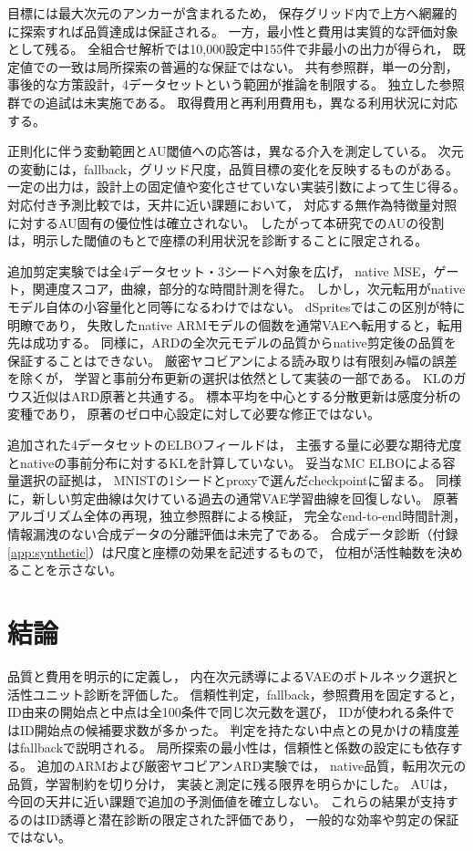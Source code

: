 \documentclass[11pt,a4paper]{ltjsarticle}
\begin{document}
目標には最大次元のアンカーが含まれるため，
保存グリッド内で上方へ網羅的に探索すれば品質達成は保証される。
一方，最小性と費用は実質的な評価対象として残る。
全組合せ解析では10,000設定中155件で非最小の出力が得られ，
既定値での一致は局所探索の普遍的な保証ではない。
共有参照群，単一の分割，事後的な方策設計，4データセットという範囲が推論を制限する。
独立した参照群での追試は未実施である。
取得費用と再利用費用も，異なる利用状況に対応する。

正則化に伴う変動範囲とAU閾値への応答は，異なる介入を測定している。
次元の変動には，fallback，グリッド尺度，品質目標の変化を反映するものがある。
一定の出力は，設計上の固定値や変化させていない実装引数によって生じ得る。
対応付き予測比較では，天井に近い課題において，
対応する無作為特徴量対照に対するAU固有の優位性は確立されない。
したがって本研究でのAUの役割は，明示した閾値のもとで座標の利用状況を診断することに限定される。

追加剪定実験では全4データセット・3シードへ対象を広げ，
native MSE，ゲート，関連度スコア，曲線，部分的な時間計測を得た。
しかし，次元転用がnativeモデル自体の小容量化と同等になるわけではない。
dSpritesではこの区別が特に明瞭であり，
失敗したnative ARMモデルの個数を通常VAEへ転用すると，転用先は成功する。
同様に，ARDの全次元モデルの品質からnative剪定後の品質を保証することはできない。
厳密ヤコビアンによる読み取りは有限刻み幅の誤差を除くが，
学習と事前分布更新の選択は依然として実装の一部である。
KLのガウス近似はARD原著と共通する。
標本平均を中心とする分散更新は感度分析の変種であり，
原著のゼロ中心設定に対して必要な修正ではない。

追加された4データセットのELBOフィールドは，
主張する量に必要な期待尤度とnativeの事前分布に対するKLを計算していない。
妥当なMC ELBOによる容量選択の証拠は，
MNISTの1シードとproxyで選んだcheckpointに留まる。
同様に，新しい剪定曲線は欠けている過去の通常VAE学習曲線を回復しない。
原著アルゴリズム全体の再現，独立参照群による検証，
完全なend-to-end時間計測，情報漏洩のない合成データの分離評価は未完了である。
合成データ診断（付録\ref{app:synthetic}）は尺度と座標の効果を記述するもので，
位相が活性軸数を決めることを示さない。

\section{結論}\label{sec:conclusion}
品質と費用を明示的に定義し，
内在次元誘導によるVAEのボトルネック選択と活性ユニット診断を評価した。
信頼性判定，fallback，参照費用を固定すると，
ID由来の開始点と中点は全100条件で同じ次元数を選び，
IDが使われる条件ではID開始点の候補要求数が多かった。
判定を持たない中点との見かけの精度差はfallbackで説明される。
局所探索の最小性は，信頼性と係数の設定にも依存する。
追加のARMおよび厳密ヤコビアンARD実験では，
native品質，転用次元の品質，学習制約を切り分け，
実装と測定に残る限界を明らかにした。
AUは，今回の天井に近い課題で追加の予測価値を確立しない。
これらの結果が支持するのはID誘導と潜在診断の限定された評価であり，
一般的な効率や剪定の保証ではない。
\end{document}
